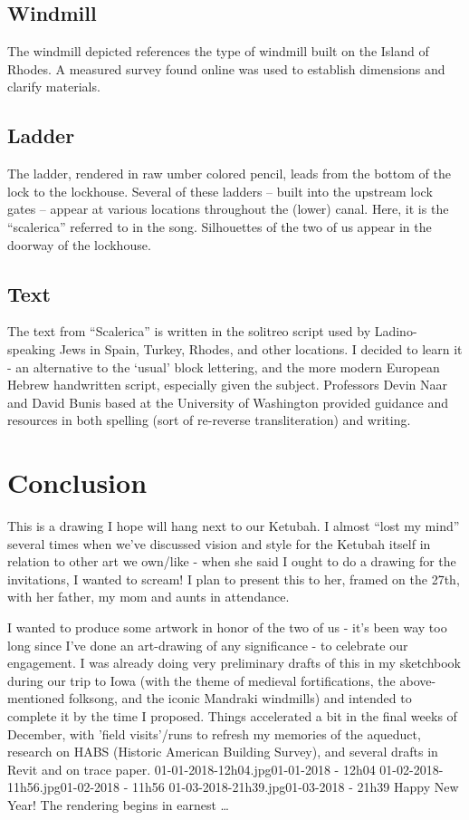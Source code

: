 ﻿\documentclass[letterpaper, 12pt, landscape]{ProgressBook}
\begin{document}
\subsection*{Windmill}

The windmill depicted references the type of windmill built on the
Island of Rhodes. A measured survey found online was used to establish
dimensions and clarify materials.

\subsection*{Ladder}

The ladder, rendered in raw umber colored pencil, leads from the
bottom of the lock to the lockhouse. Several of these ladders – built into the
upstream lock gates – appear at various locations throughout the (lower) canal.
Here, it is the “scalerica” referred to in the song. Silhouettes of the two of
us appear in the doorway of the lockhouse.

\subsection*{Text}

The text from “Scalerica” is written in the solitreo script used
by Ladino-speaking Jews in Spain, Turkey, Rhodes, and other locations. I
decided to learn it - an alternative to the ‘usual’ block lettering, and the
more modern European Hebrew handwritten script, especially given the subject.
Professors Devin Naar and David Bunis based at the University of Washington
provided guidance and resources in both spelling (sort of re-reverse
transliteration) and writing.

\section*{Conclusion}

This is a drawing I hope will hang next to our Ketubah. I almost
“lost my mind” several times when we've discussed vision and style for the
Ketubah itself in relation to other art we own/like - when she said I ought to
do a drawing for the invitations, I wanted to scream! I plan to present this to
her, framed on the 27th, with her father, my mom and aunts in attendance.

\eject

{I wanted to produce some artwork in honor of the two of us - it's been way too long since I've done an art-drawing of any significance - to celebrate our engagement. I was already doing very preliminary drafts of this in my sketchbook during our trip to Iowa (with the theme of medieval fortifications, the above-mentioned folksong, and the iconic Mandraki windmills) and intended to complete it by the time I proposed. Things accelerated a bit in the final weeks of December, with 'field visits'/runs to refresh my memories of the aqueduct, research on HABS (Historic American Building Survey), and several drafts in Revit and on trace paper. }
{01-01-2018-12h04.jpg}{01-01-2018 - 12h04}
{01-02-2018-11h56.jpg}{01-02-2018 - 11h56}
{01-03-2018-21h39.jpg}{01-03-2018 - 21h39}
{Happy New Year! The rendering begins in earnest \ldots}
\end{document}
